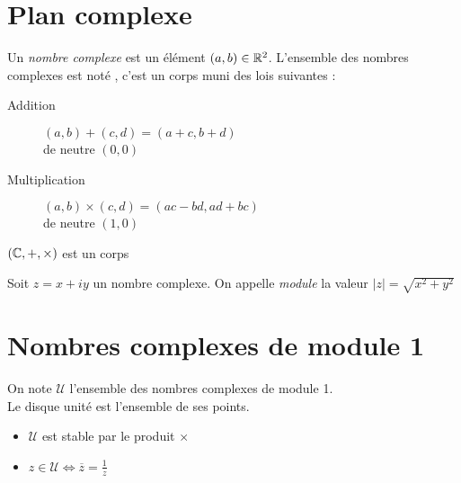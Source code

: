 \documentclass[11pt,a4paper,fleqn,pdftex]{report}
\begin{document}
\section{Plan complexe} %
\label{sec:plan_complexe}
\begin{dfn}
     Un \emph{nombre complexe} est un élément $(a,b) \in \mathbb{R}{}^2$. L'ensemble des nombres complexes est noté \Cmplx{}, c'est un corps muni des lois suivantes : 
     \begin{description}
         \item[Addition] $(a,b) + (c,d) = (a+c,b+d)$\hfill \\de neutre $(0,0)$
         \item[Multiplication] $(a,b) \times (c,d) = (ac - bd, ad + bc)$\hfill \\de neutre $(1,0)$
     \end{description}
\end{dfn}
\begin{theorem}
     $(\mathbb{C}{},+,\times{})$ est un corps 
\end{theorem}
\begin{dfn}[Module]
     Soit $z=x+iy$ un nombre complexe. On appelle \emph{module} la valeur $|z| = \sqrt{x^2 + y^2}$
\end{dfn}
\section{Nombres complexes de module 1} %
\label{sec:nombres_complexes_de_module_1}
\begin{dfn}
     On note $\mathcal{U}$ l'ensemble des nombres complexes de module 1.\\
     Le disque unité est l'ensemble de ses points.
\end{dfn}
\needspace{4cm}
\begin{prop}
    \begin{itemize}
        \item $\mathcal{U}$ est stable par le produit $\times$
        \item $z \in \mathcal{U} \Longleftrightarrow \overline{z} = \frac{1}{z}$
    \end{itemize}
\end{prop}
\end{document}
